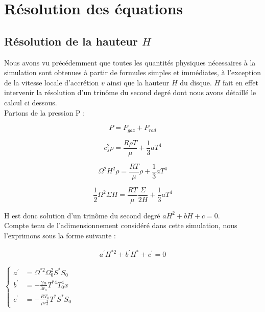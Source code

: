 \section{Résolution des équations}

\subsection{Résolution de la hauteur $H$ \label{sec::res_H}}
Nous avons vu précédemment que toutes les quantités physiques nécessaires à la simulation sont obtenues à partir de formules simples et immédiates, à l'exception de la vitesse locale d'accrétion $v$ ainsi que la hauteur $H$ du disque.  $H$ fait en effet intervenir la résolution d'un trinôme du second degré dont nous avons détaillé le calcul ci dessous. \\

Partons de la pression P : 

\begin{equation}
	P = P_{gaz} + P_{rad}
\end{equation}


\begin{equation}
	c_{s}^{2} \rho = \frac{R \rho T}{\mu} + \frac{1}{3} a T^{4}
\end{equation}


\begin{equation}
	\Omega^{2} H^{2} \rho = \frac{R T}{\mu} \rho + \frac{1}{3} a T^{4}
\end{equation}


\begin{equation}
	\frac{1}{2} \Omega^{2} \Sigma H = \frac{R T}{\mu} \frac{\Sigma}{2 H} + \frac{1}{3} a T^{4}
	\label{eq:trinôme}
\end{equation}  	   

H est donc solution d'un trinôme du second degré $ a H^{2} + b H + c = 0$. \\
Compte tenu de l'adimensionnement considéré dans cette simulation, nous l'exprimons sous la forme suivante :  

\begin{eqnarray}
  a^{\prime} H^{* 2}+b^{\prime}H^{*}+c^{\prime}=0
  \end{eqnarray}

$\begin{cases}  
      a^{\prime} &= \Omega^{*2} \Omega_{0}^{2} S^{*} S_{0}\\
      b^{\prime} &= - \frac{2 a}{3 r_{s}} T^{*4} T_{0}^{4} x \\
      c^{\prime}&=-\frac{RT_{0}}{\mu r_{s}^{2}} T^{*} S^{*} S_{0}
     \end{cases}$ \\


